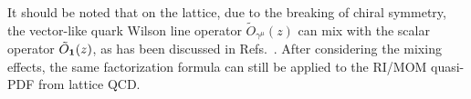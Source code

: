 It should be noted that on the lattice, due to the breaking of chiral symmetry, the vector-like quark Wilson line operator $\tilde{O}_{\gamma^\mu}(z)$ can mix with the scalar operator $\tilde{O}_{\bf 1}(z)$, as has been discussed in Refs.~\cite{Constantinou:2017sej,Alexandrou:2017huk,Chen:2017mzz,Green:2017xeu,Chen:2017mie}. After considering the mixing effects, the same factorization formula can still be applied to the RI/MOM quasi-PDF from lattice QCD.
